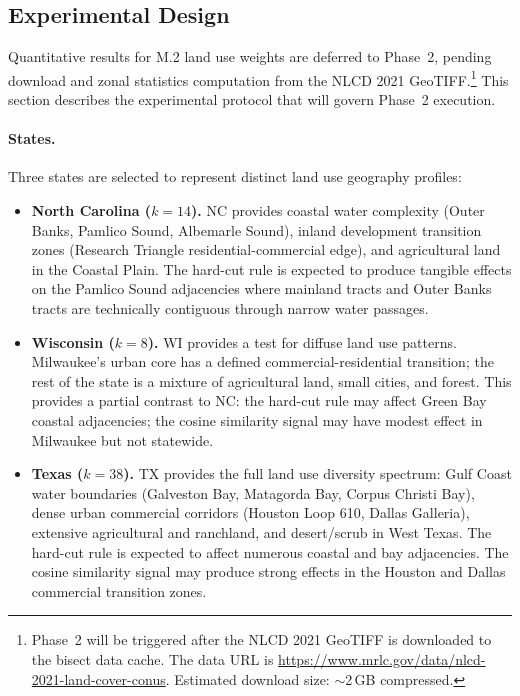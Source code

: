 \label{sec:results}

\subsection{Experimental Design}

Quantitative results for M.2 land use weights are deferred to Phase~2,
pending download and zonal statistics computation from the NLCD 2021
GeoTIFF.\footnote{Phase~2 will be triggered after the NLCD 2021 GeoTIFF is
downloaded to the bisect data cache.
The data URL is
\url{https://www.mrlc.gov/data/nlcd-2021-land-cover-conus}.
Estimated download size: $\sim$2\,GB compressed.}
This section describes the experimental protocol that will govern Phase~2
execution.

\paragraph{States.}
Three states are selected to represent distinct land use geography profiles:

\begin{itemize}
  \item \textbf{North Carolina ($k=14$).}
    NC provides coastal water complexity (Outer Banks, Pamlico Sound, Albemarle
    Sound), inland development transition zones (Research Triangle residential-commercial
    edge), and agricultural land in the Coastal Plain.
    The hard-cut rule is expected to produce tangible effects on the Pamlico
    Sound adjacencies where mainland tracts and Outer Banks tracts are
    technically contiguous through narrow water passages.
  \item \textbf{Wisconsin ($k=8$).}
    WI provides a test for diffuse land use patterns.
    Milwaukee's urban core has a defined commercial-residential transition;
    the rest of the state is a mixture of agricultural land, small cities,
    and forest.
    This provides a partial contrast to NC: the hard-cut rule may affect
    Green Bay coastal adjacencies; the cosine similarity signal may have
    modest effect in Milwaukee but not statewide.
  \item \textbf{Texas ($k=38$).}
    TX provides the full land use diversity spectrum: Gulf Coast water
    boundaries (Galveston Bay, Matagorda Bay, Corpus Christi Bay), dense
    urban commercial corridors (Houston Loop 610, Dallas Galleria), extensive
    agricultural and ranchland, and desert/scrub in West Texas.
    The hard-cut rule is expected to affect numerous coastal and bay adjacencies.
    The cosine similarity signal may produce strong effects in the Houston and
    Dallas commercial transition zones.
\end{itemize}

